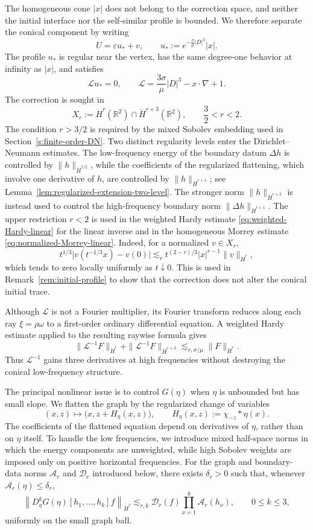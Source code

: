 \documentclass[12pt]{amsart}
\theoremstyle{remark}
\theoremstyle{definition}
\numberwithin{equation}{section}
\newcommand{\R}{\mathbb{R}}
\begin{document}
The homogeneous cone \(|x|\) does not belong to the correction space, and neither the initial interface nor the self-similar profile is bounded. 
We therefore separate the conical component by writing
\[
 U=\varepsilon u_*+v,
 \qquad
 u_*:=e^{-\frac{\sigma}{\mu}|D|^3}|x|.
\]
The profile \(u_*\) is regular near the vertex, has the same degree-one behavior at infinity as \(|x|\), and satisfies
\[
 \mathcal Lu_*=0, \qquad \mathcal L = \frac{3\sigma}{\mu}|D|^3-x\cdot\nabla+1.
\]
The correction is sought in
\[
 X_r := \dot H^r(\R^2)\cap\dot H^{r+3}(\R^2), \qquad \frac32<r<2.
\]
The condition \(r>3/2\) is required by the mixed Sobolev embedding used in Section~\ref{s:finite-order-DN}.  
Two distinct regularity levels enter the Dirichlet--Neumann estimates.
The low-frequency energy of the boundary datum \(\Delta h\) is controlled by \(\|h\|_{\dot H^{5/2}}\), while the coefficients of the regularized flattening, which involve one derivative of \(h\), are controlled by \(\|h\|_{\dot H^{r+1}}\);
see Lemma~\ref{lem:regularized-extension-two-level}.  
The stronger norm \(\|h\|_{\dot H^{r+3}}\) is instead used to control the high-frequency boundary norm \(\|\Delta h\|_{\dot H^{r+1}}\).
The upper restriction \(r<2\) is used in the weighted Hardy estimate \eqref{eq:weighted-Hardy-linear} for the linear inverse and in the homogeneous Morrey estimate \eqref{eq:normalized-Morrey-linear}.
Indeed, for a normalized \(v\in X_r\),
\[
 t^{1/3}
 \bigl|v(t^{-1/3}x)-v(0)\bigr|
 \lesssim_r
 t^{(2-r)/3}|x|^{r-1}\|v\|_{\dot H^r},
\]
which tends to zero locally uniformly as \(t\downarrow0\). This is
used in Remark~\ref{rem:initial-profile} to show that the correction
does not alter the conical initial trace.

Although \(\mathcal L\) is not a Fourier multiplier, its Fourier transform reduces along each ray \(\xi=\rho\omega\) to a first-order ordinary differential equation. 
A weighted Hardy estimate applied to the resulting raywise formula gives
\[
 \|\mathcal L^{-1}F\|_{\dot H^r} +
 \|\mathcal L^{-1}F\|_{\dot H^{r+3}}
 \lesssim_{r,\sigma/\mu}  \|F\|_{\dot H^r}.
\]
Thus \(\mathcal L^{-1}\) gains three derivatives at high frequencies
without destroying the conical low-frequency structure.


The principal nonlinear issue is to control \(G(\eta)\) when \(\eta\) is
unbounded but has small slope.
We flatten the graph by the regularized change of variables
\[
 (x,z)\longmapsto \bigl(x,z+H_\eta(x,z)\bigr),
 \qquad H_\eta(x,z):=\chi_{-z}*\eta(x).
\]
The coefficients of the flattened equation depend on derivatives of \(\eta\), rather than on \(\eta\) itself. 
To handle the low frequencies, we introduce mixed half-space norms in which the energy components are unweighted, while high Sobolev weights are imposed only on positive horizontal frequencies. 
For the graph and boundary-data norms \(\mathcal A_r\) and \(\mathcal D_r\) introduced below, there exists \(\delta_r>0\) such that, whenever \(\mathcal A_r(\eta)\leq\delta_r\),
\[
 \left\| D_\eta^kG(\eta)[h_1,\ldots,h_k]f \right\|_{\dot H^r} \lesssim_{r,k} \mathcal D_r(f)
 \prod_{\nu=1}^k\mathcal A_r(h_\nu),
 \qquad 0\leq k\leq3,
\]
uniformly on the small graph ball.
\end{document}
